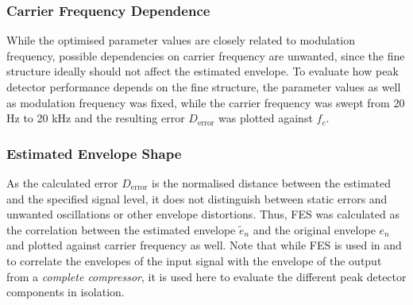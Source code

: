\documentclass[../main2.tex]{subfiles}
\begin{document}
\subsubsection{Carrier Frequency Dependence}
While the optimised parameter values are closely related to modulation frequency, possible dependencies on carrier frequency are unwanted, since the fine structure ideally should not affect the estimated envelope. To evaluate how peak detector performance depends on the fine structure, the parameter values as well as modulation frequency was fixed, while the carrier frequency was swept from 20 Hz to 20 kHz and the resulting error $D_\text{error}$ was plotted against $f_c$.

\subsubsection{Estimated Envelope Shape}
As the calculated error $D_\text{error}$ is the normalised distance between the estimated and the specified signal level, it does not distinguish between static errors and unwanted oscillations or other envelope distortions. Thus, FES was calculated as the correlation between the estimated envelope $\tilde{e}_n$ and the original envelope $e_n$ and plotted against carrier frequency as well. Note that while FES is used in \cite{stone1992syllabic}\cite{stone2007quantifying} and \cite{reiss2012tutorial} to correlate the envelopes of the input signal with the envelope of the output from a \emph{complete compressor}, it is used here to evaluate the different peak detector components in isolation. 
\end{document}
